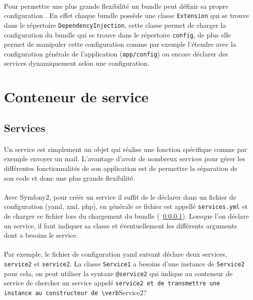 \paragraph{}
\label{configuration}
Pour permettre une plus grande flexibilité un bundle peut définir sa propre configuration . En effet chaque bundle possède une classe \verb?Extension? qui se trouve dans le répertoire \verb?DependencyInjection?, cette classe permet de charger la configuration du bundle qui se trouve dans le répertoire \verb?config?, de plus elle permet de manipuler cette configuration comme par exemple l'étendre avec la configuration générale de l'application (\verb?app/config?) ou encore déclarer des services dynamiquement selon une configuration. 
\section{Conteneur de service}

\subsection{Services}
\paragraph{}
Un service est simplement un objet qui réalise une fonction spécifique comme par exemple envoyer un mail. L'avantage d'avoir de nombreux services pour gérer les différentes fonctionnalités de son application est de permettre la séparation de son code et donc une plus grande flexibilité.
\paragraph{}
Avec Symfony2, pour créér un service il suffit de le déclarer dans un fichier de configuration (yaml, xml, php), en générale ce fichier est appellé \verb?services.yml?
et de charger ce fichier lors du chargement du bundle (~\ref{configuration}).
Lorsque l'on déclare un service, il faut indiquer sa classe et éventuellement les différents arguments dont a besoins le service.
\paragraph{}
Par exemple, le fichier de configuration yaml suivant déclare deux services, \verb?service2? et \verb?service2?.
La classe \verb?Service1? a besoins d'une instance de \verb?Service2? pour cela, on peut utiliser la syntaxe \verb?@service2? qui indique au conteneur de service de chercher un service appelé \verb?service2 et de transmettre une instance au constructeur de \verb?Service2?

